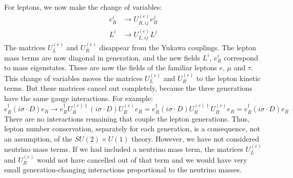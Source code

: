 \documentclass[../../main/main.tex]{subfiles}
\begin{document}
For leptons, we now make the change of variables:
\begin{align}
	e^i_R &\longrightarrow U_{R,ij}^{(e)} e_{R}^j	\\
	L^i   &\longrightarrow U_{L,ij}^{(e)} L^j
\end{align}
The matrices \( U^{(e)}_L \) and \( U_R^{(e)} \) disappear from the Yukawa couplings. The lepton mass terms are now diagonal in generation, and the new fields \( L^i \), \( e^i_R \) correspond to mass eigenstates. These are now the fields of the familiar leptons \( e \), \( \mu \) and \( \tau \). This change of variables moves the matrices \( U_L^{(e)} \) and \( U_R^{(e)} \) to the lepton kinetic terms. But these matrices cancel out completely, because the three generations have the same gauge interactions. For example:
\begin{equation}
	e^{\dag}_R (i \sigma \cdot D) e_R
	\longrightarrow
	e^{\dag}_R U_R^{(e) \dag} (i \sigma \cdot D) U_R^{(e)} e_R
	=
	e^{\dag}_R (i \sigma \cdot D) U_R^{(e) \dag} U_R^{(e)} e_R
	=
	e^{\dag}_R (i \sigma \cdot D) e_R
	\label{eq:}
\end{equation}
There are no interactions remaining that couple the lepton generations. Thus, lepton number conservation, separately for each generation, is a consequence, not an assumption, of the \( SU(2) \times U(1) \) theory. However, we have not considered neutrino mass terms. If we had included a neutrino mass term, the matrices \( U_L^{(e)} \) and \( U_R^{(e)} \) would not have cancelled out of that term and we would have very small generation-changing interactions proportional to the neutrino masses.
\end{document}

